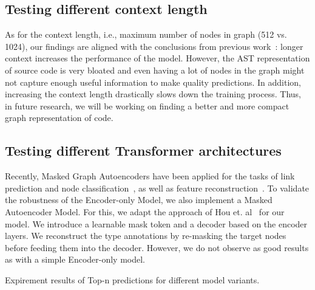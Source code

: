 \subsection{Testing different context length}\label{subsec:testing-different-context-length}

As for the context length, i.e., maximum number of nodes in graph (512 vs. 1024), our findings are aligned with the conclusions from previous work~\cite{arutyunov_big_2022}:
longer context increases the performance of the model.
However, the AST representation of source code is very bloated and even having a lot of nodes in the graph might not capture
enough useful information to make quality predictions.
In addition, increasing the context length drastically slows down the training process.
Thus, in future research, we will be working on finding a better and more compact graph representation of code.

\subsection{Testing different Transformer architectures}\label{subsec:testing-different-transformer-architectures-(encoder-only-vs-encoder-decoder)}

Recently, Masked Graph Autoencoders have been applied for the tasks of link prediction and node classification~\cite{tan2022mgae},
as well as feature reconstruction~\cite{zhang2022graph, hou2022graphmae}.
To validate the robustness of the Encoder-only Model, we also implement a Masked Autoencoder Model.
For this, we adapt the approach of Hou et. al~\cite{hou2022graphmae} for our model.
We introduce a learnable mask token and a decoder based on the encoder layers.
We reconstruct the type annotations by re-masking the target nodes before feeding them into the decoder.
However, we do not observe as good results as with a simple Encoder-only model.

\begin{table}
    \centering
    \caption{Expirement results of Top-n predictions for different model variants.}
    \label{tab:ablation}
    
\end{table}